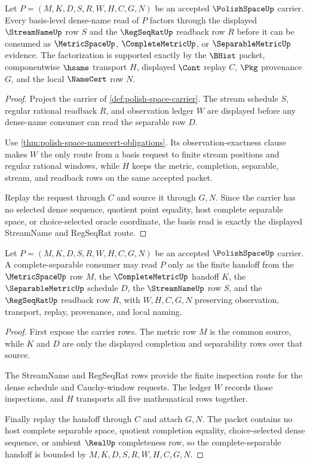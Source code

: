\begin{theorem}
\label{thm:polish-space-streamname-basis}
Let $P=(M,K,D,S,R,W,H,C,G,N)$ be an accepted $\PolishSpaceUp$ carrier. Every basis-level dense-name read of $P$ factors through the displayed $\StreamNameUp$ row $S$ and the $\RegSeqRatUp$ readback row $R$ before it can be consumed as $\MetricSpaceUp$, $\CompleteMetricUp$, or $\SeparableMetricUp$ evidence. The factorization is supported exactly by the $\BHist$ packet, componentwise $\hsame$ transport $H$, displayed $\Cont$ replay $C$, $\Pkg$ provenance $G$, and the local $\NameCert$ row $N$.
\end{theorem}
\begin{proof}
Project the carrier of \autoref{def:polish-space-carrier}. The stream schedule $S$, regular rational readback $R$, and observation ledger $W$ are displayed before any dense-name consumer can read the separable row $D$.

Use \autoref{thm:polish-space-namecert-obligations}. Its observation-exactness clause makes $W$ the only route from a basis request to finite stream positions and regular rational windows, while $H$ keeps the metric, completion, separable, stream, and readback rows on the same accepted packet.

Replay the request through $C$ and source it through $G,N$. Since the carrier has no selected dense sequence, quotient point equality, host complete separable space, or choice-selected oracle coordinate, the basis read is exactly the displayed StreamName and RegSeqRat route.
\end{proof}

\begin{theorem}
\label{thm:polish-space-complete-separable-handoff}
Let $P=(M,K,D,S,R,W,H,C,G,N)$ be an accepted $\PolishSpaceUp$ carrier. A complete-separable consumer may read $P$ only as the finite handoff from the $\MetricSpaceUp$ row $M$, the $\CompleteMetricUp$ handoff $K$, the $\SeparableMetricUp$ schedule $D$, the $\StreamNameUp$ row $S$, and the $\RegSeqRatUp$ readback row $R$, with $W,H,C,G,N$ preserving observation, transport, replay, provenance, and local naming.
\end{theorem}
\begin{proof}
First expose the carrier rows. The metric row $M$ is the common source, while $K$ and $D$ are only the displayed completion and separability rows over that source.

The StreamName and RegSeqRat rows provide the finite inspection route for the dense schedule and Cauchy-window requests. The ledger $W$ records those inspections, and $H$ transports all five mathematical rows together.

Finally replay the handoff through $C$ and attach $G,N$. The packet contains no host complete separable space, quotient completion equality, choice-selected dense sequence, or ambient $\RealUp$ completeness row, so the complete-separable handoff is bounded by $M,K,D,S,R,W,H,C,G,N$.
\end{proof}

